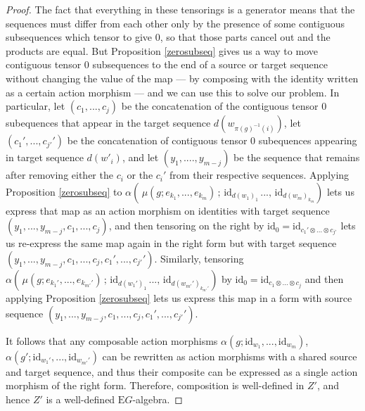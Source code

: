 \documentclass{amsart} %
\begin{document}
\begin{proof}
The fact that everything in these tensorings is a generator means that the sequences must differ from each other only by the presence of some contiguous subsequences which tensor to give 0, so that those parts cancel out and the products are equal. But Proposition \ref{zerosubseq} gives us a way to move contiguous tensor 0 subsequences to the end of a source or target sequence without changing the value of the map --- by composing with the identity written as a certain action morphism --- and we can use this to solve our problem. In particular, let $(c_1, ..., c_j)$ be the concatenation of the contiguous tensor 0 subequences that appear in the target sequence $d(w_{\pi(g)^{-1}(i)})$, let $(c_1', ..., c_{j'}')$ be the concatenation of contiguous tensor 0 subequences appearing in target sequence $d(w'_i)$, and let $(y_1, ...., y_{m-j})$ be the sequence that remains after removing either the $c_i$ or the $c_i'$ from their respective sequences. Applying Proposition \ref{zerosubseq} to $\alpha( \, \mu(g; e_{k_1}, ..., e_{k_m}) \, ; \, \mathrm{id}_{d(w_1)_1} \, ..., \, \mathrm{id}_{d(w_m)_{k_m}})$ lets us express that map as an action morphism on identities with target sequence $(y_1, ..., y_{m-j}, c_1, ..., c_j)$, and then tensoring on the right by $\mathrm{id}_0 = \mathrm{id}_{c_1' \otimes ... \otimes c_{j'}}$ lets us re-express the same map again in the right form but with target sequence $(y_1, ..., y_{m-j}, c_1, ..., c_j, c_1', ..., c_{j'}')$. Similarly, tensoring $\alpha( \, \mu(g; e_{k_1'}, ..., e_{k_{m'}'}) \, ; \, \mathrm{id}_{d(w_1')_1} \, ..., \, \mathrm{id}_{d(w_{m'}')_{k_{m'}'}} )$ by $\mathrm{id}_0 = \mathrm{id}_{c_1 \otimes ... \otimes c_j}$ and then applying Proposition \ref{zerosubseq} lets us express this map in a form with source sequence $(y_1, ..., y_{m-j}, c_1, ..., c_j, c_1', ..., c_{j'}')$. 

It follows that any composable action morphisms $\alpha(g; \mathrm{id}_{w_1}, ..., \mathrm{id}_{w_m})$, $\alpha(g'; \mathrm{id}_{w_1'}, ..., \mathrm{id}_{w_{m'}'})$ can be rewritten as action morphisms with a shared source and target sequence, and thus their composite can be expressed as a single action morphism of the right form. Therefore, composition is well-defined in $Z'$, and hence $Z'$ is a well-defined $\mathrm{E}G$-algebra.


\end{proof}
\end{document}
